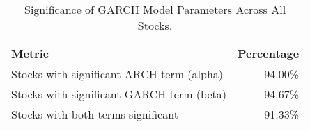 \begin{table}
\caption{Significance of GARCH Model Parameters Across All Stocks.}
\label{tab:garch_summary}
\begin{tabular}{lr}
\toprule
Metric & Percentage \\
\midrule
Stocks with significant ARCH term (alpha) & 94.00\% \\
Stocks with significant GARCH term (beta) & 94.67\% \\
Stocks with both terms significant & 91.33\% \\
\bottomrule
\end{tabular}
\end{table}
